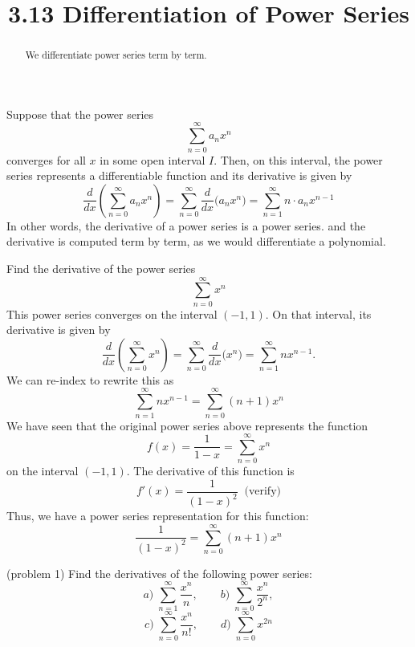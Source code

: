 \documentclass[handout]{ximera}
\title{3.13 Differentiation of Power Series}
\begin{document}
\begin{abstract}
We differentiate power series term by term.
\end{abstract}

\maketitle



Suppose that the power series 
\[
\sum_{n=0}^\infty a_n x^n
\]
converges for all $x$ in some open interval $I$. Then, on this interval, the power series represents a differentiable function and its derivative is given by 
\[
\frac{d}{dx} \left( \sum_{n=0}^\infty a_n x^n \right) = \sum_{n=0}^\infty  \frac{d}{dx}\big( a_n x^n \big)  
= \sum_{n=1}^\infty   n\cdot a_n x^{n-1}
\]
In other words, the derivative of a power series is a power series. and the derivative is computed term by term, as we would differentiate a polynomial.

\begin{example}[example 1]
Find the derivative of the power series
\[
\sum_{n=0}^\infty x^n
\]
This power series converges on the interval $(-1, 1)$.
On that interval, its derivative is given by
\[
\frac{d}{dx}\left( \sum_{n=0}^\infty x^n \right)= \sum_{n=0}^\infty \frac{d}{dx} \big(x^n\big) = \sum_{n=1}^\infty nx^{n-1}.
\]
We can re-index to rewrite this as
\[
\sum_{n=1}^\infty nx^{n-1} = \sum_{n=0}^\infty (n+1)x^n
\]
We have seen that the original power series above represents the function 
\[
f(x) = \frac{1}{1-x} = \sum_{n=0}^\infty x^n
\]
on the interval $(-1, 1)$. The derivative of this function is
\[
f'(x) = \frac{1}{(1-x)^2} \;\; \text{(verify)}
\]
Thus, we have a power series representation for this function:
\[
\frac{1}{(1-x)^2} = \sum_{n=0}^\infty (n+1)x^n
\]
\end{example}



\begin{problem}(problem 1)
Find the derivatives of the following power series:
\[
a) \; \sum_{n=1}^\infty \frac{x^n}{n},\qquad  b) \; \sum_{n=0}^\infty \frac{x^n}{2^n},
\]
\[
 c) \; \sum_{n=0}^\infty \frac{x^n}{n!},\qquad d) \; \sum_{n=0}^\infty x^{2n}
\]
\end{problem}
\end{document}

